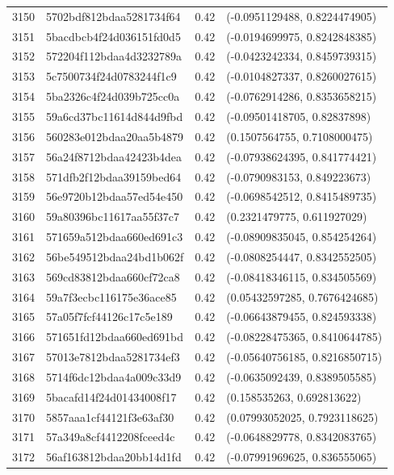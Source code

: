 \begin{table}[ht]
\begin{tabular}{rlrl}
  3150 & 5702bdf812bdaa5281734f64 & 0.42 & (-0.0951129488, 0.8224474905) \\ 
  3151 & 5bacdbcb4f24d036151fd0d5 & 0.42 & (-0.0194699975, 0.8242848385) \\ 
  3152 & 572204f112bdaa4d3232789a & 0.42 & (-0.0423242334, 0.8459739315) \\ 
  3153 & 5c7500734f24d0783244f1c9 & 0.42 & (-0.0104827337, 0.8260027615) \\ 
  3154 & 5ba2326c4f24d039b725cc0a & 0.42 & (-0.0762914286, 0.8353658215) \\ 
  3155 & 59a6cd37bc11614d844d9fbd & 0.42 & (-0.09501418705, 0.82837898) \\ 
  3156 & 560283e012bdaa20aa5b4879 & 0.42 & (0.1507564755, 0.7108000475) \\ 
  3157 & 56a24f8712bdaa42423b4dea & 0.42 & (-0.07938624395, 0.841774421) \\ 
  3158 & 571dfb2f12bdaa39159bed64 & 0.42 & (-0.0790983153, 0.849223673) \\ 
  3159 & 56e9720b12bdaa57ed54e450 & 0.42 & (-0.0698542512, 0.8415489735) \\ 
  3160 & 59a80396bc11617aa55f37c7 & 0.42 & (0.2321479775, 0.611927029) \\ 
  3161 & 571659a512bdaa660ed691c3 & 0.42 & (-0.08909835045, 0.854254264) \\ 
  3162 & 56be549512bdaa24bd1b062f & 0.42 & (-0.0808254447, 0.8342552505) \\ 
  3163 & 569cd83812bdaa660cf72ca8 & 0.42 & (-0.08418346115, 0.834505569) \\ 
  3164 & 59a7f3ecbc116175e36ace85 & 0.42 & (0.05432597285, 0.7676424685) \\ 
  3165 & 57a05f7fcf44126c17c5e189 & 0.42 & (-0.06643879455, 0.824593338) \\ 
  3166 & 571651fd12bdaa660ed691bd & 0.42 & (-0.08228475365, 0.8410644785) \\ 
  3167 & 57013e7812bdaa5281734ef3 & 0.42 & (-0.05640756185, 0.8216850715) \\ 
  3168 & 5714f6dc12bdaa4a009c33d9 & 0.42 & (-0.0635092439, 0.8389505585) \\ 
  3169 & 5bacafd14f24d01434008f17 & 0.42 & (0.158535263, 0.692813622) \\ 
  3170 & 5857aaa1cf44121f3e63af30 & 0.42 & (0.07993052025, 0.7923118625) \\ 
  3171 & 57a349a8cf4412208fceed4c & 0.42 & (-0.0648829778, 0.8342083765) \\ 
  3172 & 56af163812bdaa20bb14d1fd & 0.42 & (-0.07991969625, 0.836555065) \\ 

\end{tabular}
\end{table}
